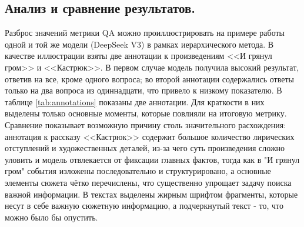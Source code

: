\documentclass{article}
\begin{document}
\subsection*{Анализ и сравнение результатов.}
Разброс значений метрики QA можно проиллюстрировать на примере работы одной и той же модели (DeepSeek V3) в рамках иерархического метода.
В качестве иллюстрации взяты две аннотации к произведениям <<И грянул гром>> и <<Кастрюк>>. 
В первом случае модель получила высокий результат, ответив на все, кроме одного вопроса; во второй 
аннотации содержались ответы только на два вопроса из одиннадцати, что привело к низкому показателю. В таблице \ref{tab:annotations} показаны две аннотации. 
Для краткости в них выделены только основные моменты, которые
повлияли на итоговую метрику. 
Сравнение показывает возможную причину столь значительного расхождения: аннотация к рассказу <<Кастрюк>> содержит большое количество лирических отступлений и художественных деталей,
из-за чего суть произведения сложно уловить и модель отвлекается от фиксации главных фактов,
тогда как в "И грянул гром" события изложены последовательно и структурировано, 
а основные элементы сюжета чётко перечислены, что существенно упрощает задачу поиска важной информации.
В текстах выделены жирным шрифтом фрагменты, которые несут в себе важную сюжетную информацию, а подчеркнутый текст - то, что можно было бы опустить.
\end{document}
